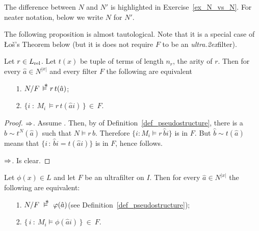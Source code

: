 The difference between $N$ and $N'$ is highlighted in Exercise~\ref{ex_N_vs_N}.
For neater notation, below we write $N$ for $N'$.

The following proposition is almost tautological.
Note that it is a special case of \L o\v{s}'s Theorem below (but it is does not require $F$ to be an \textit{ultra\kern.2ex}filter).

\begin{proposition}\label{prop_eq_ultra}
  Let $r\in L_{\rm rel}$.
  Let $t(x)$ be tuple of terms of length $n_r$, the arity of $r$.
  Then for every $\hat a\in N^{|x|}$ and every filter $F$ the following are equivalent
  \begin{itemize}
  \item[1.] $N/F\,\pmodels r\,t(\hat a)$;

  \item[2.] $\big\{i\; :\ M_i\,\models r\,t(\hat ai)\,\big\}\,\in\, F$.
  \end{itemize}
\end{proposition}

\begin{proof}
  $\Rightarrow$.
  Assume .
  Then, by  of Definition~\ref{def_pseudostructure}, there is a $\hat b\sim t^N(\hat a)$ such that $N\models r\,\hat b$.
  Therefore $\{i:M_i\models r\,\hat bi\}$ is in $F$.
  But $\hat b\sim t(\hat a)$ means that $\big\{i\, :\, \hat bi= t(\hat ai)\big\}$ is in $F$, hence  follows.

  $\Rightarrow$.
Is clear.
\end{proof}

\begin{void}[\L o\'{s}'s Theorem]\label{thm_los}
Let $\phi(x)\in L$ and let $F$ be an ultrafilter on $I$.
Then for every $\hat a\in N^{|x|}$ the following are equivalent:
\begin{itemize}
\item[1.] $N/F\ \pmodels\ \phi(\hat a)$\hfill (see  Definition~\ref{def_pseudostructure});
\item[2.] $\big\{\,i\ :\ M_i\models \phi(\hat a i)\,\big\}\ \in\ F$.
\end{itemize}
\end{void}

